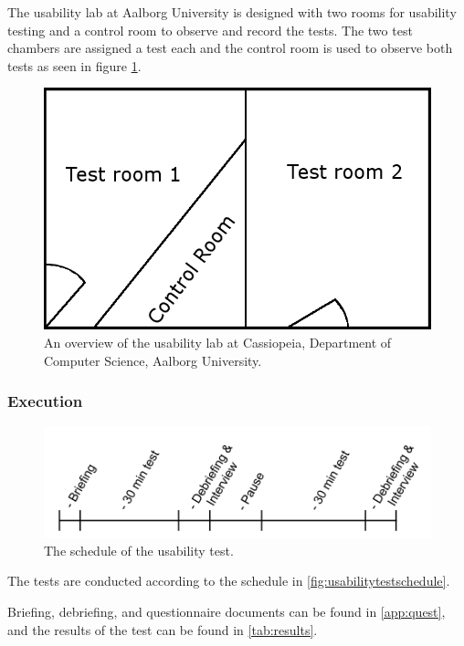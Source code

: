 The usability lab at Aalborg University is designed with two rooms for usability testing and a control room to observe and record the tests.
The two test chambers are assigned a test each and the control room is used to observe both tests as seen in figure \ref{fig:testsetup}.

\begin{figure}[H]
	\centering
		\includegraphics[width=\textwidth]{images/testSetup.png}
	\caption{An overview of the usability lab at Cassiopeia, Department of Computer Science, Aalborg University.}
	\label{fig:testsetup}
\end{figure}

\subsubsection*{Execution}

\begin{figure}[H]
	\centering
		\includegraphics[width=\textwidth]{images/usabilityTestSchedule.png}
	\caption{The schedule of the usability test.}
	\label{fig:usabilitytestschedule}
\end{figure}

The tests are conducted according to the schedule in \autoref{fig:usabilitytestschedule}.

Briefing, debriefing, and questionnaire documents can be found in \autoref{app:quest}, and the results of the test can be found in \autoref{tab:results}.